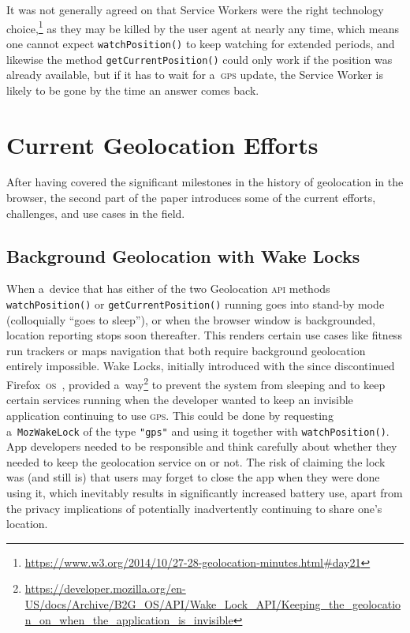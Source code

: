 \documentclass[sigconf,hyphens]{acmart}
\begin{document}
It was not generally agreed on that Service Workers were the right technology
choice,\footnote{\url{https://www.w3.org/2014/10/27-28-geolocation-minutes.html\#day21}}
as they may be killed by the user agent at nearly any time,
which means one cannot expect \texttt{watchPosition()} to keep watching for extended periods,
and likewise the method \texttt{getCurrentPosition()} could only work if the position was already
available, but if it has to wait for a~\textsc{gps} update, the Service Worker is likely to be gone
by the time an answer comes back.

\section{Current Geolocation Efforts}

After having covered the significant milestones in the history of geolocation in the browser,
the second part of the paper introduces some of the current efforts, challenges,
and use cases in the field.

\subsection{Background Geolocation with Wake Locks}
\label{sec:wakelocks}

When a~device that has either of the two Geolocation \textsc{api} methods
\texttt{watchPosition()} or \texttt{getCurrentPosition()} running
goes into stand-by mode (colloquially ``goes to sleep''), or
when the browser window is backgrounded, location reporting stops soon thereafter.
This renders certain use cases like fitness run trackers or maps navigation
that both require background geolocation entirely impossible.
Wake Locks, initially introduced with the since discontinued
Firefox~\textsc{os}~\cite{francis2017firefoxos}, provided
a~way\footnote{\url{https://developer.mozilla.org/en-US/docs/Archive/B2G_OS/API/Wake_Lock_API/Keeping_the_geolocation_on_when_the_application_is_invisible}}
to prevent the system from sleeping and to keep certain services running
when the developer wanted to keep an invisible application continuing to use \textsc{gps}.
This could be done by requesting a~\texttt{MozWakeLock} of the type \texttt{"gps"}
and using it together with \texttt{watchPosition()}.
App developers needed to be responsible and think carefully about
whether they needed to keep the geolocation service on or not.
The risk of claiming the lock was (and still is) that users may forget to close the app
when they were done using it, which inevitably results in significantly increased battery use,
apart from the privacy implications of potentially inadvertently continuing to share one's location.
\end{document}
